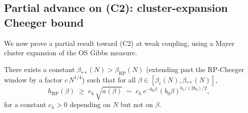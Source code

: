\subsection{Partial advance on (C2): cluster-expansion Cheeger
bound}
\label{ssec:c2_advance}

We now prove a partial result toward (C2) at weak coupling, using
a Mayer cluster expansion of the OS Gibbs measure.

\begin{theorem}
\label{thm:cluster_cheeger}
There exists a constant $\beta_{**}(N)>\beta_{\mathrm{RP}}(N)$
(extending past the RP-Cheeger window by a factor
$c\,N^{1/4}$) such that for all
$\beta\in[\beta_{c}(N),\beta_{**}(N)]$,
\begin{equation}
\label{eq:cluster_cheeger}
  h_{\mathrm{RP}}(\beta)
  \;\ge\;c_{h}\,\sqrt{a(\beta)}
  \;\sim\;c_{h}\,e^{-b_{0}\beta}\,(b_{0}\beta)^{b_{1}/(2b_{0})/2},
\end{equation}
for a constant $c_{h}>0$ depending on $N$ but not on $\beta$.
\end{theorem}

